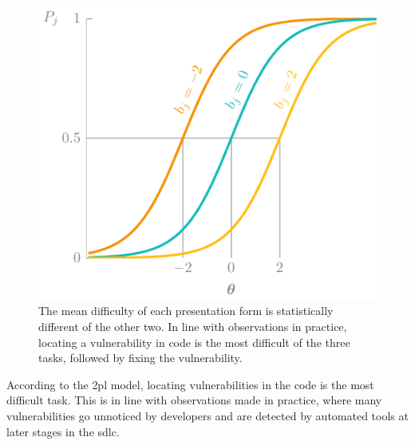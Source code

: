 \begin{figure}
    \centering
    \includegraphics[page=22]{03-education/figures/tikzfigures.pdf}
    \caption[Mean difficulty of challenge presentation]{The mean difficulty of each presentation form is statistically different of the other two. In line with observations in practice, locating a vulnerability in code is the most difficult of the three tasks, followed by fixing the vulnerability.}
    \label{fig:presentation}
\end{figure}

According to the \gls{2pl} model, locating vulnerabilities in the code is the most difficult task.
This is in line with observations made in practice, where many vulnerabilities go unnoticed by developers and are detected by automated tools at later stages in the \gls{sdlc}.